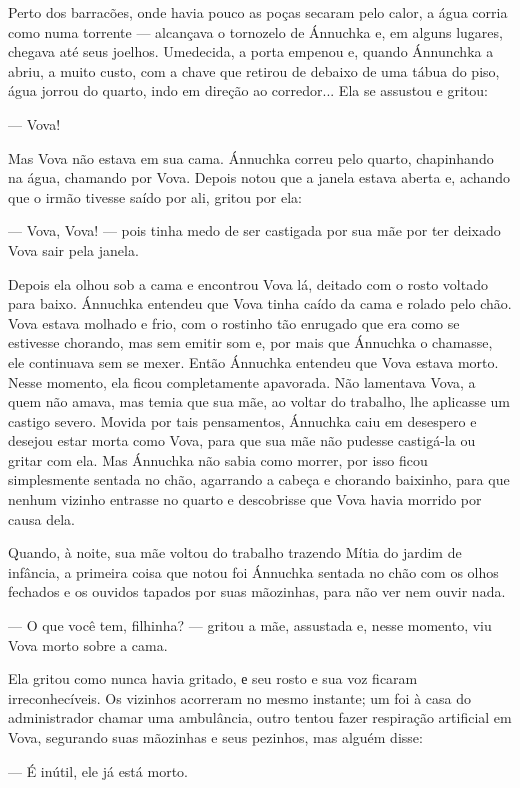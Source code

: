Perto dos barracões, onde havia pouco as poças secaram pelo calor, a
água corria como numa torrente --- alcançava o tornozelo de Ánnuchka e,
em alguns lugares, chegava até seus joelhos. Umedecida, a porta empenou
e, quando Ánnunchka a abriu, a muito custo, com a chave que retirou de
debaixo de uma tábua do piso, água jorrou do quarto, indo em direção ao
corredor... Ela se assustou e gritou:

--- Vova!

Mas Vova não estava em sua cama. Ánnuchka correu pelo quarto,
chapinhando na água, chamando por Vova. Depois notou que a janela estava
aberta e, achando que o irmão tivesse saído por ali, gritou por ela:

--- Vova, Vova! --- pois tinha medo de ser castigada por sua mãe por ter
deixado Vova sair pela janela.

Depois ela olhou sob a cama e encontrou Vova lá, deitado com o rosto
voltado para baixo. Ánnuchka entendeu que Vova tinha caído da cama e
rolado pelo chão. Vova estava molhado e frio, com o rostinho tão
enrugado que era como se estivesse chorando, mas sem emitir som e, por
mais que Ánnuchka o chamasse, ele continuava sem se mexer. Então
Ánnuchka entendeu que Vova estava morto. Nesse momento, ela ficou
completamente apavorada. Não lamentava Vova, a quem não amava, mas temia
que sua mãe, ao voltar do trabalho, lhe aplicasse um castigo severo.
Movida por tais pensamentos, Ánnuchka caiu em desespero e desejou estar
morta como Vova, para que sua mãe não pudesse castigá-la ou gritar com
ela. Mas Ánnuchka não sabia como morrer, por isso ficou simplesmente
sentada no chão, agarrando a cabeça e chorando baixinho, para que nenhum
vizinho entrasse no quarto e descobrisse que Vova havia morrido por
causa dela.

Quando, à noite, sua mãe voltou do trabalho trazendo Mítia do jardim de
infância, a primeira coisa que notou foi Ánnuchka sentada no chão com os
olhos fechados e os ouvidos tapados por suas mãozinhas, para não ver nem
ouvir nada.

--- O que você tem, filhinha? --- gritou a mãe, assustada e, nesse
momento, viu Vova morto sobre a cama.

Ela gritou como nunca havia gritado, е seu rosto e sua voz ficaram
irreconhecíveis. Os vizinhos acorreram no mesmo instante; um foi à casa
do administrador chamar uma ambulância, outro tentou fazer respiração
artificial em Vova, segurando suas mãozinhas e seus pezinhos, mas alguém
disse:

--- É inútil, ele já está morto.

